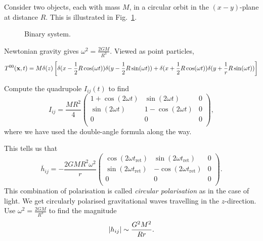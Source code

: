 \begin{example}
  Consider two objects, each with mass $M$, in a circular orbit in the $(x-y)$-plane at distance $R$. 
  This is illustrated in Fig.~\ref{fig:l22f2}.
  \begin{figure}[tbhp]
    \centering
    \def\svgwidth{0.4\columnwidth}
    
    \caption{Binary system.}
    \label{fig:l22f2}
  \end{figure}

  Newtonian gravity gives $\omega^2 = \frac{2 G M }{R^3}$. Viewed as point particles, 
  \begin{equation}
    T^{00}(\vb{x}, t) = M \delta(z) \left[ \delta(x - \frac{1}{2} R \cos(\omega t)) \delta(y - \frac{1}{2} R \sin(\omega t)) + \delta(x + \frac{1}{2} R \cos(\omega t)) \delta(y + \frac{1}{r} R \sin(\omega t)) \right]
  \end{equation}

  Compute the quadrupole $I_{ij}(t)$  to find 
  \begin{equation}
    I_{ij} = \frac{MR^2}{4}
    \begin{pmatrix}
     1 + \cos(2 \omega t) & \sin(2 \omega t) & 0 \\
     \sin(2 \omega t) & 1 - \cos(2\omega t) & 0 \\
     0 & 0 & 0 \\
    \end{pmatrix},
  \end{equation}
  where we have used the double-angle formula along the way.

  This tells us that 
  \begin{equation}
    \overline{h}_{ij} = - \frac{2 G M R^2 \omega^2}{r} 
    \begin{pmatrix}
     \cos(2 \omega t_{\text{ret}}) & \sin(2 \omega t_{\text{ret}}) & 0 \\
     \sin(2 \omega t_{\text{ret}}) & - \cos(2 \omega t_{\text{ret}}) & 0 \\
     0 & 0 & 0 \\
    \end{pmatrix}.
  \end{equation}
  This combination of polarisation is called \emph{circular polarisation} as in the case of light.
  We get circularly polarised gravitational waves travelling in the $z$-direction.
  Use $\omega^2 =\frac{2 GM}{R^3}$ to find the magnitude 
  \begin{equation}
    \abs{h_{ij}} \sim \frac{G^2M^2}{R r}.
  \end{equation}


\end{example}

